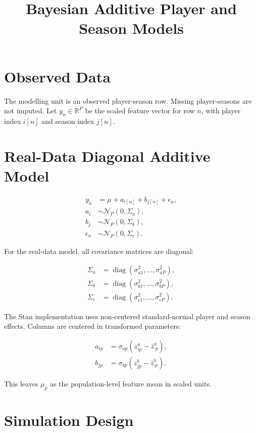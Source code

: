 \documentclass[11pt]{article}
\title{Bayesian Additive Player and Season Models}
\author{}
\date{}
\begin{document}
\maketitle

\section{Observed Data}

The modelling unit is an observed player-season row. Missing player-seasons are not imputed. Let
$y_n \in \mathbb{R}^P$ be the scaled feature vector for row $n$, with player index $i[n]$
and season index $j[n]$.

\section{Real-Data Diagonal Additive Model}

\begin{align}
y_n &= \mu + a_{i[n]} + b_{j[n]} + \epsilon_n, \\
a_i &\sim \mathcal{N}_P(0, \Sigma_a), \\
b_j &\sim \mathcal{N}_P(0, \Sigma_b), \\
\epsilon_n &\sim \mathcal{N}_P(0, \Sigma_\epsilon).
\end{align}

For the real-data model, all covariance matrices are diagonal:

\begin{align}
\Sigma_a &= \operatorname{diag}(\sigma_{a1}^2,\ldots,\sigma_{aP}^2), \\
\Sigma_b &= \operatorname{diag}(\sigma_{b1}^2,\ldots,\sigma_{bP}^2), \\
\Sigma_\epsilon &= \operatorname{diag}(\sigma_{\epsilon1}^2,\ldots,\sigma_{\epsilon P}^2).
\end{align}

The Stan implementation uses non-centered standard-normal player and season effects. Columns are centered in transformed parameters:

\begin{align}
a_{ip} &= \sigma_{ap}\left(z^a_{ip} - \bar{z}^a_{\cdot p}\right), \\
b_{jp} &= \sigma_{bp}\left(z^b_{jp} - \bar{z}^b_{\cdot p}\right).
\end{align}

This leaves $\mu_p$ as the population-level feature mean in scaled units.

\section{Simulation Design}
\end{document}
